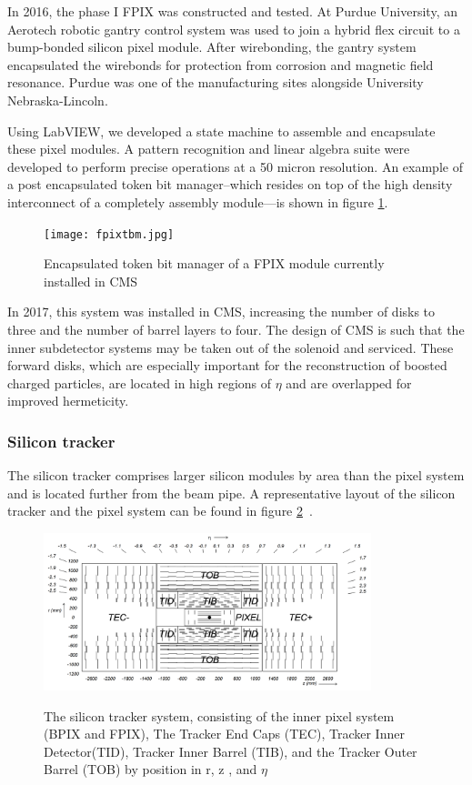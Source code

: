 In 2016, the phase I FPIX was constructed and tested. At Purdue University, an Aerotech robotic gantry control system was used to join a hybrid flex circuit to a bump-bonded silicon pixel module. After wirebonding, the gantry system encapsulated the wirebonds for protection from corrosion and magnetic field resonance. Purdue was one of the manufacturing sites alongside University Nebraska-Lincoln. 

Using LabVIEW, we developed a state machine to assemble and encapsulate these pixel modules. A pattern recognition and linear algebra suite were developed to perform precise operations at a 50 micron resolution. An example of a post encapsulated token bit manager--which resides on top of the high density interconnect of a completely assembly module---is shown in figure \ref{fig:tbm}.

\begin{figure}[ht!b]
\label{fig:tbm} 
    \centering
  \texttt{[image: fpixtbm.jpg]}
    \caption{Encapsulated token bit manager of a FPIX module currently installed in CMS}
\end{figure}


In 2017, this system was installed in CMS, increasing the number of disks to three and the number of barrel layers to four.  The design of CMS is such that the inner subdetector systems may be taken out of the solenoid and serviced.  
These forward disks, which are especially important for the reconstruction of boosted charged particles, are located in high regions of $\eta$ and are overlapped for improved hermeticity.  


\subsubsection{Silicon tracker}
The silicon tracker comprises larger silicon modules by area than the pixel system and is located further from the beam pipe. A representative layout of the silicon tracker and the pixel system can be found in figure \ref{fig:tracker}~\cite{Chatrchyan:2008zzk}. 

\begin{figure}[ht!b]
\label{fig:tracker}
  \centering
  \includegraphics[width=0.85\textwidth]{figures/silicon/SiliconTracker.png}\\
    \caption{ The silicon tracker system, consisting of the inner pixel system (BPIX and FPIX), The Tracker End Caps (TEC), Tracker Inner Detector(TID), Tracker Inner Barrel (TIB), and the Tracker Outer Barrel (TOB) by position in r, z , and $\eta$~\cite{Chatrchyan:2008zzk}}
\end{figure}




